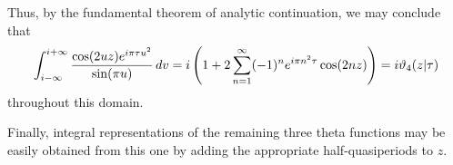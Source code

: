 \documentclass[12pt]{article}
\begin{document}
Thus, by the fundamental theorem of analytic continuation, we may conclude that
 $$\int_{i-\infty}^{i + \infty} {\cos (2 u z) e^{i \pi \tau u^2} \over \sin (\pi u)} \, dv = i \left( 1 + 2 \sum_{n = 1}^\infty (-1)^n e^{i \pi n^2 \tau} \cos(2 n z) \right) = i \vartheta_4 (z | \tau)$$
throughout this domain.

Finally, integral representations of the remaining three theta functions may be easily obtained from this one by adding the appropriate half-quasiperiods to $z$.
\end{document}
